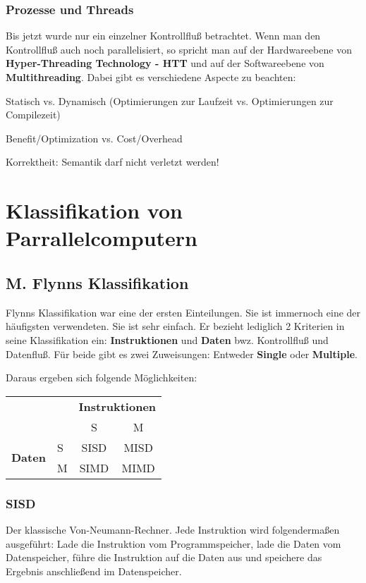 \subsubsection{Prozesse und Threads}
Bis jetzt wurde nur ein einzelner Kontrollfluß betrachtet. Wenn man den Kontrollfluß
auch noch parallelisiert, so spricht man auf der Hardwareebene von \textbf{
Hyper-Threading Technology - HTT} und auf der Softwareebene von \textbf{Multithreading}.
Dabei gibt es verschiedene Aspecte zu beachten:

\begin{compactitem}
\item Statisch vs. Dynamisch (Optimierungen zur Laufzeit vs. Optimierungen zur Compilezeit)
\item Benefit/Optimization vs. Cost/Overhead
\item Korrektheit: Semantik darf nicht verletzt werden!
\end{compactitem}

\section{Klassifikation von Parrallelcomputern}

\subsection{M. Flynns Klassifikation}
Flynns Klassifikation war eine der ersten Einteilungen. Sie ist immernoch eine
der häufigsten verwendeten. Sie ist sehr einfach. Er bezieht lediglich 2 Kriterien
in seine Klassifikation ein: \textbf{Instruktionen} und \textbf{Daten} bwz.
Kontrollfluß und Datenfluß. Für beide gibt es zwei Zuweisungen: Entweder \textbf{
Single} oder \textbf{Multiple}.

Daraus ergeben sich folgende Möglichkeiten: 
\begin{center}
\begin{tabular}{|ll|cc|}\hline
&&\multicolumn{2}{c|}{\textbf{Instruktionen}}\\
&&S&M\\\hline
\multirow{2}{*}{\textbf{Daten}}&S & SISD & MISD\\
&M & SIMD & MIMD\\\hline
\end{tabular}
\end{center}

\subsubsection{SISD}
Der klassische Von-Neumann-Rechner. Jede Instruktion wird folgendermaßen ausgeführt:
Lade die Instruktion vom Programmspeicher, lade die Daten vom Datenspeicher, 
führe die Instruktion auf die Daten aus und speichere das Ergebnis anschließend
im Datenspeicher.

